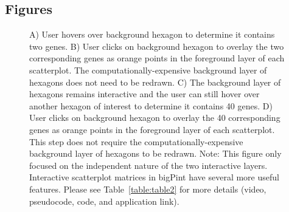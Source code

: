 \documentclass[parskip=full]{bmcart} %
\begin{document}
\begin{backmatter}



\section*{Figures}
\begin{figure}[h!]
\caption{
A) User hovers over background hexagon to determine it contains two genes. B) User clicks on background hexagon to overlay the two corresponding genes as orange points in the foreground layer of each scatterplot. The computationally-expensive background layer of hexagons does not need to be redrawn. C) The background layer of hexagons remains interactive and the user can still hover over another hexagon of interest to determine it contains 40 genes. D) User clicks on background hexagon to overlay the 40 corresponding genes as orange points in the foreground layer of each scatterplot. This step does not require the computationally-expensive background layer of hexagons to be redrawn. Note: This figure only focused on the independent nature of the two interactive layers. Interactive scatterplot matrices in bigPint have several more useful features. Please see Table~\ref{table:table2} for more details (video, pseudocode, code, and application link).}
\label{figureSM}
\end{figure}


\end{backmatter}
\end{document}
